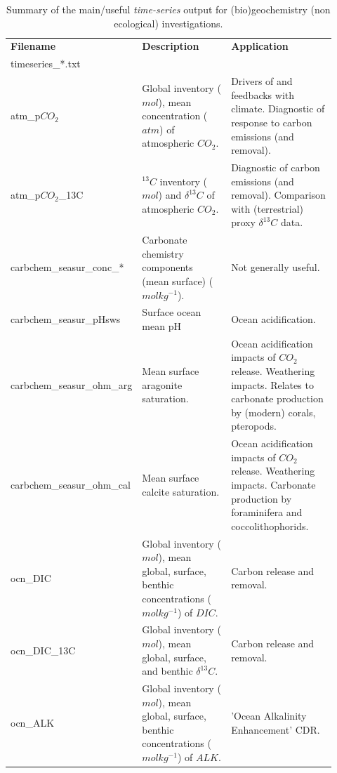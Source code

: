 \begin{table}[ht!]
\begin{tabular}{p{0.275\linewidth} p{0.30\linewidth} p{0.35\linewidth}}
\toprule
\textbf{Filename} & \textbf{Description} & \textbf{Application}\\
\textsf{\footnotesize timeseries\_*.txt} & &\\
\midrule

\textsf{\footnotesize atm\_p\(CO_{2}\)} & \small{Global inventory (\(mol\)), mean concentration (\(atm\)) of atmospheric \(CO_{2}\). } & \small{Drivers of and feedbacks with climate. Diagnostic of response to carbon emissions (and removal).}\\
\textsf{\footnotesize atm\_p\(CO_{2}\)\_13C} & \small{\(^{13}C\) inventory (\(mol\)) and \(\delta^{13}C\) of atmospheric \(CO_{2}\).} & \small{Diagnostic of carbon emissions (and removal). Comparison with (terrestrial) proxy \(\delta^{13}C\) data.}\\

\midrule

\textsf{\footnotesize carbchem\_seasur\_conc\_*} & \small{Carbonate chemistry components (mean surface) (\(molkg^{-1}\)).} & \small{Not generally useful. }\\
\textsf{\footnotesize carbchem\_seasur\_pHsws} & \small{Surface ocean mean pH} & Ocean acidification.\\
\textsf{\footnotesize carbchem\_seasur\_ohm\_arg} & \small{Mean surface aragonite saturation.} & \small{Ocean acidification impacts of \(CO_{2}\) release. Weathering impacts. Relates to carbonate production by (modern) corals, pteropods.}\\
\textsf{\footnotesize carbchem\_seasur\_ohm\_cal} & \small{Mean surface calcite saturation.} & \small{Ocean acidification impacts of \(CO_{2}\) release. Weathering impacts. Carbonate production by foraminifera and coccolithophorids.}\\

\midrule

\textsf{\footnotesize ocn\_DIC} & \small{Global inventory (\(mol\)), mean global,  surface, benthic concentrations (\(molkg^{-1}\)) of \(DIC\).} & \small{Carbon release and removal.}\\
\textsf{\footnotesize ocn\_DIC\_13C} & \small{Global inventory (\(mol\)), mean global,  surface, and benthic \(\delta^{13}C\).} & \small{Carbon release and removal.}\\
\textsf{\footnotesize ocn\_ALK} & \small{Global inventory (\(mol\)), mean global,  surface, benthic concentrations (\(molkg^{-1}\)) of \(ALK\).} & \small{'Ocean Alkalinity Enhancement' CDR.}\\

\bottomrule
\end{tabular}
\caption{Summary of the main/useful \textit{time-series} output for (bio)geochemistry (non ecological) investigations.}
\end{table}

